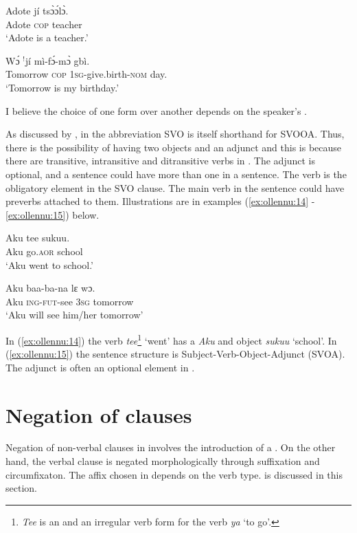 \documentclass[output=paper
,newtxmath
,modfonts
,nonflat]{langsci/langscibook}
\begin{document}
\ea \label{ex:ollennu:12}
\gll Adote j\'i ts\`ɔ\'ɔl\`ɔ.\\
Adote \textsc{cop} teacher\\
\glt`Adote is a teacher.'
\z

\ea \label{ex:ollennu:13}
\gll W\'ɔ $^{!}$j\'i m\`i-f\'ɔ-m\`ɔ gb\`i.\\
Tomorrow \textsc{cop} 1\textsc{sg}-give.birth-\textsc{nom} day.\\
\glt `Tomorrow is my birthday.'
\z


I believe the choice of one form over another depends on the speaker’s .

As discussed by \citet{Dakubu2003}, in  the abbreviation SVO is itself shorthand for SVOOA. Thus, there is the possibility of having two objects and an adjunct and this is because there are transitive, intransitive and ditransitive verbs in . The adjunct is optional, and a sentence could have more than one in a sentence. The verb is the obligatory element in the SVO clause. The main verb in the sentence could have preverbs attached to them. Illustrations are in examples (\ref{ex:ollennu:14} -\ref{ex:ollennu:15}) below.

\ea \label{ex:ollennu:14}
\gll Aku tee sukuu.\\
Aku go.\textsc{aor} school\\
\glt `Aku went to school.'
\z

\ea \label{ex:ollennu:15}
 \gll Aku baa-ba-na lɛ wɔ.\\
Aku \textsc{ing}-\textsc{fut}-see 3\textsc{sg} tomorrow\\
\glt`Aku will see him/her tomorrow'
\z


In (\ref{ex:ollennu:14}) the verb \textit{tee}\footnote{\textit{Tee} is an  and an irregular verb form for the verb \textit{ya} `to go'.} `went' has a  \textit{Aku} and object \textit{sukuu} `school'. In (\ref{ex:ollennu:15}) the sentence structure is Subject-Verb-Object-Adjunct (SVOA). The adjunct is often an optional element in .

\section{\label{sec:ollennu:2} Negation of clauses}


Negation of non-verbal clauses in  involves the introduction of a . On the other hand, the verbal clause is negated morphologically through suffixation and circumfixaton. The affix chosen in  depends on the verb type.   is discussed in this section.
\end{document}

